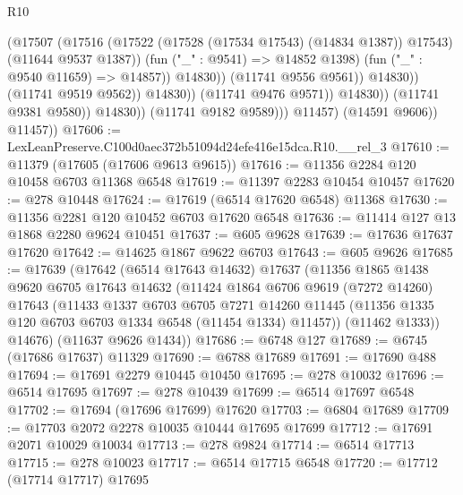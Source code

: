 \begin{lexlean}{R10}
\begin{coremodule}
                                            (@17507
                                              (@17516
                                                (@17522
                                                  (@17528 (@17534 @17543) (@14834 @1387))
                                                  @17543)
                                                (@11644 @9537 @1387))
                                              (fun ("_" : @9541) => @14852 @1398)
                                              (fun ("_" : @9540 @11659) => @14857))
                                            @14830))
                                        (@11741 @9556 @9561))
                                      @14830))
                                  (@11741 @9519 @9562))
                                @14830))
                            (@11741 @9476 @9571))
                          @14830))
                      (@11741 @9381 @9580))
                    @14830))
                (@11741 @9182 @9589)))
            @11457)
          (@14591 @9606))
        @11457))
@17606 := LexLeanPreserve.C100d0aec372b51094d24efe416e15dca.R10.__rel_3
@17610 := @11379 (@17605 (@17606 @9613 @9615))
@17616 := @11356 @2284 @120 @10458 @6703 @11368 @6548
@17619 := @11397 @2283 @10454 @10457
@17620 := @278 @10448
@17624 := @17619 (@6514 @17620 @6548) @11368
@17630 := @11356 @2281 @120 @10452 @6703 @17620 @6548
@17636 := @11414 @127 @13 @1868 @2280 @9624 @10451
@17637 := @605 @9628
@17639 := @17636 @17637 @17620
@17642 := @14625 @1867 @9622 @6703
@17643 := @605 @9626
@17685 := @17639
    (@17642
      (@6514 @17643 @14632)
      @17637
      (@11356
        @1865
        @1438
        @9620
        @6705
        @17643
        @14632
        (@11424
          @1864
          @6706
          @9619
          (@7272 @14260)
          @17643
          (@11433
            @1337
            @6703
            @6705
            @7271
            @14260
            @11445
            (@11356 @1335 @120 @6703 @6703 @1334 @6548 (@11454 @1334) @11457))
          (@11462 @1333))
        @14676)
      (@11637 @9626 @1434))
@17686 := @6748 @127
@17689 := @6745 (@17686 @17637) @11329
@17690 := @6788 @17689
@17691 := @17690 @488
@17694 := @17691 @2279 @10445 @10450
@17695 := @278 @10032
@17696 := @6514 @17695
@17697 := @278 @10439
@17699 := @6514 @17697 @6548
@17702 := @17694 (@17696 @17699) @17620
@17703 := @6804 @17689
@17709 := @17703 @2072 @2278 @10035 @10444 @17695 @17699
@17712 := @17691 @2071 @10029 @10034
@17713 := @278 @9824
@17714 := @6514 @17713
@17715 := @278 @10023
@17717 := @6514 @17715 @6548
@17720 := @17712 (@17714 @17717) @17695

\end{coremodule}
\end{lexlean}

